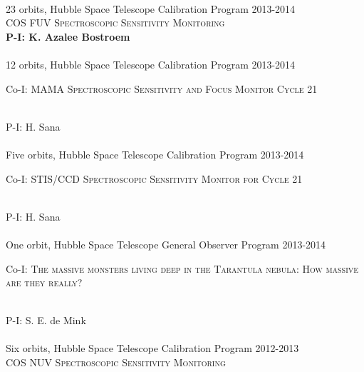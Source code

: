 \documentclass[10pt]{cv}
\begin{document}
\begin{llist}
\\
23 orbits, Hubble Space Telescope Calibration Program \hfill 2013-2014\\ %
\textsc{COS FUV Spectroscopic Sensitivity Monitoring}\\
{\bf P-I: K. Azalee Bostroem} \\ %
\\
12 orbits, Hubble Space Telescope Calibration Program \hfill  2013-2014\\ %
\begin{minipage}[l]{0.7\textwidth}\vspace{0.15cm}
Co-I: \textsc{MAMA Spectroscopic Sensitivity and Focus Monitor Cycle 21}
\end{minipage}\vspace{0.15cm}\\ 
P-I: H. Sana \\ %
\\
Five orbits, Hubble Space Telescope Calibration Program \hfill  2013-2014\\ %
\begin{minipage}[l]{0.7\textwidth}\vspace{0.15cm}
Co-I: \textsc{STIS/CCD Spectroscopic Sensitivity Monitor for Cycle 21} 
\end{minipage}\vspace{0.15cm}\\
P-I: H. Sana\\ %
\\
One orbit, Hubble Space Telescope General Observer Program \hfill  2013-2014\\ %
\begin{minipage}[l]{0.7\textwidth}\vspace{0.15cm}
Co-I: \textsc{The massive monsters living deep in the Tarantula nebula: How massive are they really?} 
\end{minipage}\vspace{0.15cm}\\
P-I: S. E. de Mink\\ %
\\
Six orbits, Hubble Space Telescope Calibration Program \hfill 2012-2013\\ %
\textsc{COS NUV Spectroscopic Sensitivity Monitoring}\\

\end{llist}
\end{document}
